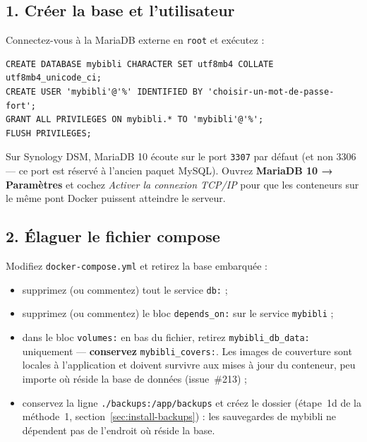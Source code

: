 \subsection*{1. Créer la base et l'utilisateur}

Connectez-vous à la MariaDB externe en \texttt{root} et exécutez :

\begin{lstlisting}
CREATE DATABASE mybibli CHARACTER SET utf8mb4 COLLATE utf8mb4_unicode_ci;
CREATE USER 'mybibli'@'%' IDENTIFIED BY 'choisir-un-mot-de-passe-fort';
GRANT ALL PRIVILEGES ON mybibli.* TO 'mybibli'@'%';
FLUSH PRIVILEGES;
\end{lstlisting}

\begin{note}
Sur Synology DSM, MariaDB 10 écoute sur le port \texttt{3307} par
défaut (et non 3306 — ce port est réservé à l'ancien paquet MySQL).
Ouvrez \textbf{MariaDB 10 → Paramètres} et cochez \emph{Activer la
connexion TCP/IP} pour que les conteneurs sur le même pont Docker
puissent atteindre le serveur.
\end{note}

\subsection*{2. Élaguer le fichier compose}

Modifiez \texttt{docker-compose.yml} et retirez la base embarquée :

\begin{itemize}
  \item supprimez (ou commentez) tout le service \texttt{db:} ;
  \item supprimez (ou commentez) le bloc \texttt{depends\_on:} sur le
        service \texttt{mybibli} ;
  \item dans le bloc \texttt{volumes:} en bas du fichier, retirez
        \texttt{mybibli\_db\_data:} uniquement —
        \textbf{conservez} \texttt{mybibli\_covers:}.
        Les images de couverture sont locales à l'application et doivent
        survivre aux mises à jour du conteneur, peu importe où réside
        la base de données (issue~\#213) ;
  \item conservez la ligne \texttt{./backups:/app/backups} et créez le
        dossier (étape~1d de la méthode~1,
        section~\ref{sec:install-backups}) : les sauvegardes de mybibli
        ne dépendent pas de l'endroit où réside la base.
\end{itemize}

